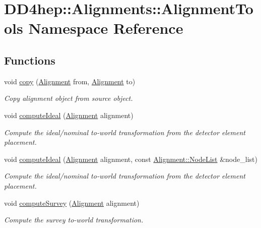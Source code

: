 \hypertarget{namespace_d_d4hep_1_1_alignments_1_1_alignment_tools}{}\section{D\+D4hep\+:\+:Alignments\+:\+:Alignment\+Tools Namespace Reference}
\label{namespace_d_d4hep_1_1_alignments_1_1_alignment_tools}
\subsection*{Functions}
\begin{DoxyCompactItemize}
\item 
void \hyperlink{namespace_d_d4hep_1_1_alignments_1_1_alignment_tools_a03e005e692b6427d78828d1785791a50}{copy} (\hyperlink{class_d_d4hep_1_1_alignments_1_1_alignment}{Alignment} from, \hyperlink{class_d_d4hep_1_1_alignments_1_1_alignment}{Alignment} to)
\begin{DoxyCompactList}\small\item\em Copy alignment object from source object. \end{DoxyCompactList}\item 
void \hyperlink{namespace_d_d4hep_1_1_alignments_1_1_alignment_tools_a009dd48155bddca23afba151e2887124}{compute\+Ideal} (\hyperlink{class_d_d4hep_1_1_alignments_1_1_alignment}{Alignment} alignment)
\begin{DoxyCompactList}\small\item\em Compute the ideal/nominal to-\/world transformation from the detector element placement. \end{DoxyCompactList}\item 
void \hyperlink{namespace_d_d4hep_1_1_alignments_1_1_alignment_tools_a531f04a21638b77afa2f81378f5837cd}{compute\+Ideal} (\hyperlink{class_d_d4hep_1_1_alignments_1_1_alignment}{Alignment} alignment, const \hyperlink{class_d_d4hep_1_1_alignments_1_1_alignment_a83282984664b4e1117f46d8a8bc40cb7}{Alignment\+::\+Node\+List} \&node\+\_\+list)
\begin{DoxyCompactList}\small\item\em Compute the ideal/nominal to-\/world transformation from the detector element placement. \end{DoxyCompactList}\item 
void \hyperlink{namespace_d_d4hep_1_1_alignments_1_1_alignment_tools_af9a9447a5a7239e67ab41f0157931822}{compute\+Survey} (\hyperlink{class_d_d4hep_1_1_alignments_1_1_alignment}{Alignment} alignment)
\begin{DoxyCompactList}\small\item\em Compute the survey to-\/world transformation. \end{DoxyCompactList}\end{DoxyCompactItemize}


